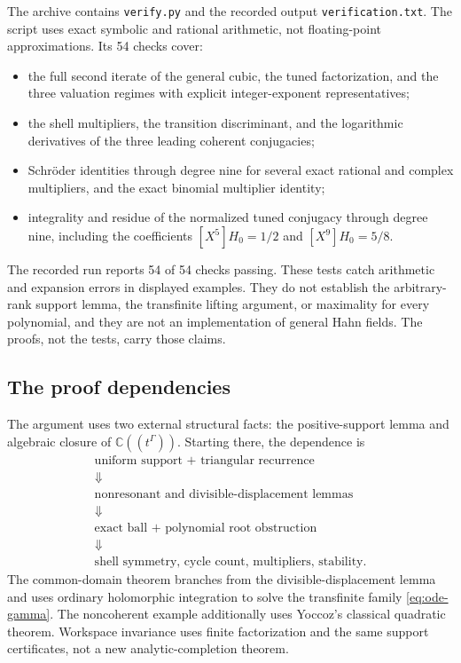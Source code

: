 \documentclass[11pt,letterpaper]{article}
\numberwithin{equation}{section}
\theoremstyle{plain}
\theoremstyle{definition}
\theoremstyle{remark}
\newcommand{\C}{\mathbb C}
\begin{document}
The archive contains \texttt{verify.py} and the recorded output
\texttt{verification.txt}. The script uses exact symbolic and rational
arithmetic, not floating-point approximations. Its 54 checks cover:
\begin{itemize}
\item the full second iterate of the general cubic, the tuned factorization,
and the three valuation regimes with explicit integer-exponent
representatives;
\item the shell multipliers, the transition discriminant, and the
logarithmic derivatives of the three leading coherent conjugacies;
\item Schr\"oder identities through degree nine for several exact rational
and complex multipliers, and the exact binomial multiplier identity;
\item integrality and residue of the normalized tuned conjugacy through
degree nine, including the coefficients $[X^5]H_0=1/2$ and
$[X^9]H_0=5/8$.
\end{itemize}
The recorded run reports 54 of 54 checks passing. These tests catch arithmetic
and expansion errors in displayed examples. They do not establish the
arbitrary-rank support lemma, the transfinite lifting argument, or maximality
for every polynomial, and they are not an implementation of general Hahn
fields. The proofs, not the tests, carry those claims.

\subsection{The proof dependencies}

The argument uses two external structural facts: the positive-support lemma
and algebraic closure of $\C((t^\Gamma))$. Starting there, the dependence is
\[
\begin{gathered}
 \text{uniform support + triangular recurrence}\\
 \Downarrow\\
 \text{nonresonant and divisible-displacement lemmas}\\
 \Downarrow\\
 \text{exact ball + polynomial root obstruction}\\
 \Downarrow\\
 \text{shell symmetry, cycle count, multipliers, stability}.
\end{gathered}
\]
The common-domain theorem branches from the divisible-displacement lemma
and uses ordinary holomorphic integration to solve the transfinite family
\eqref{eq:ode-gamma}. The noncoherent example additionally uses Yoccoz's
classical quadratic theorem. Workspace invariance uses finite factorization
and the same support certificates, not a new analytic-completion theorem.
\end{document}
